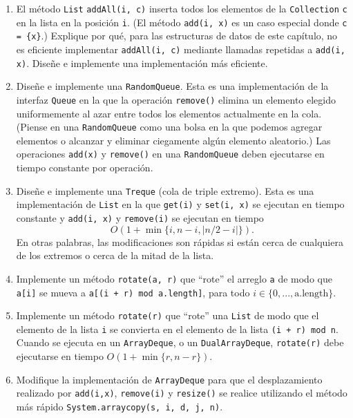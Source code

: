 \documentclass[11pt]{book}
\theoremstyle{plain}
\begin{document}
\begin{enumerate}[label=\textbf{Ejercicio 2.\arabic*.}, leftmargin=*, itemsep=8pt]

\item El método \texttt{List} \texttt{addAll(i, c)} inserta todos los elementos de la \texttt{Collection} \texttt{c} en la lista en la posición \texttt{i}. (El método \texttt{add(i, x)} es un caso especial donde \texttt{c = \{x\}}.) Explique por qué, para las estructuras de datos de este capítulo, no es eficiente implementar \texttt{addAll(i, c)} mediante llamadas repetidas a \texttt{add(i, x)}. Diseñe e implemente una implementación más eficiente.

\item Diseñe e implemente una \texttt{RandomQueue}. Esta es una implementación de la interfaz \texttt{Queue} en la que la operación \texttt{remove()} elimina un elemento elegido uniformemente al azar entre todos los elementos actualmente en la cola. (Piense en una \texttt{RandomQueue} como una bolsa en la que podemos agregar elementos o alcanzar y eliminar ciegamente algún elemento aleatorio.) Las operaciones \texttt{add(x)} y \texttt{remove()} en una \texttt{RandomQueue} deben ejecutarse en tiempo constante por operación.

\item Diseñe e implemente una \texttt{Treque} (cola de triple extremo). Esta es una implementación de \texttt{List} en la que \texttt{get(i)} y \texttt{set(i, x)} se ejecutan en tiempo constante y \texttt{add(i, x)} y \texttt{remove(i)} se ejecutan en tiempo
$$
O(1 + \min\{i, n - i, |n/2 - i|\}) .
$$
En otras palabras, las modificaciones son rápidas si están cerca de cualquiera de los extremos o cerca de la mitad de la lista.

\item Implemente un método \texttt{rotate(a, r)} que ``rote'' el arreglo \texttt{a} de modo que \texttt{a[i]} se mueva a \texttt{a[(i + r) mod a.length]}, para todo $i \in \{0, ..., \text{a.length}\}$.

\item Implemente un método \texttt{rotate(r)} que ``rote'' una \texttt{List} de modo que el elemento de la lista \texttt{i} se convierta en el elemento de la lista \texttt{(i + r) mod n}. Cuando se ejecuta en un \texttt{ArrayDeque}, o un \texttt{DualArrayDeque}, \texttt{rotate(r)} debe ejecutarse en tiempo $O(1 + \min\{r, n - r\})$.

\item Modifique la implementación de \texttt{ArrayDeque} para que el desplazamiento realizado por \texttt{add(i,x)}, \texttt{remove(i)} y \texttt{resize()} se realice utilizando el método más rápido \texttt{System.arraycopy(s, i, d, j, n)}.


\end{enumerate}
\end{document}

